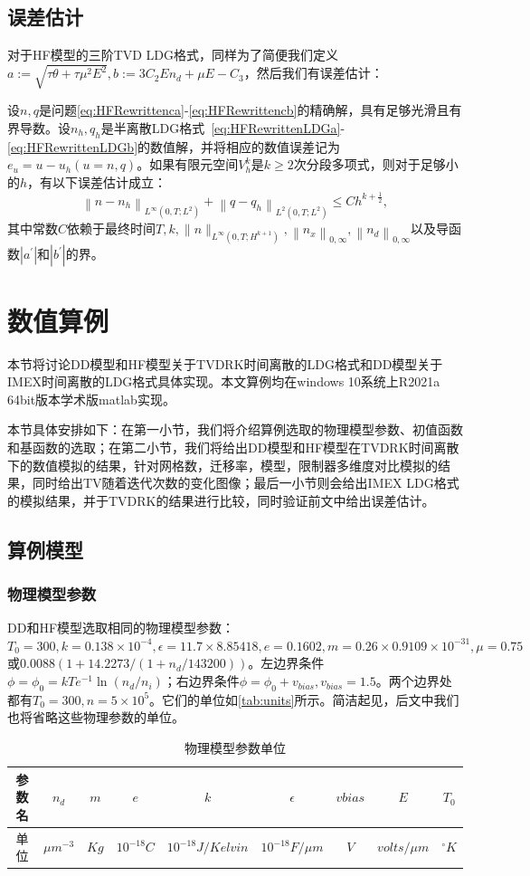 \subsection{误差估计}
对于HF模型的三阶TVD LDG格式，同样为了简便我们定义$a:=\sqrt{\tau \theta+\tau \mu^{2}E^{2}}, b:=3 C_{2} E n_{d}+\mu E-C_{3}$，然后我们有误差估计\cite{liu2010error}：
\begin{theorem}
	设$n, q$是问题\eqref{eq:HFRewrittenca}-\eqref{eq:HFRewrittencb}的精确解，具有足够光滑且有界导数。设$n_h, q_h$是半离散LDG格式~\eqref{eq:HFRewrittenLDGa}-\eqref{eq:HFRewrittenLDGb}的数值解，并将相应的数值误差记为$e_{u}=u-u_{h}(u=n, q)$。如果有限元空间$V_{h}^{k}$是$k \geq 2$次分段多项式，则对于足够小的$h$，有以下误差估计成立：
	$$
		\left\|n-n_h\right\|_{L^{\infty}\left(0, T ; L^{2}\right)}+\left\|q-q_h\right\|_{L^{2}\left(0, T ; L^{2}\right)} \leq C h^{k+\frac{1}{2}},
	$$
	其中常数$C$依赖于最终时间$T, k, \|n\|_{L^{\infty}\left(0, T ; H^{k+1}\right)}, \left\|n_{x}\right\|_{0, \infty}, \left\|n_{d}\right\|_{0, \infty}$以及导函数$\left|a^{\prime}\right|$和$\left|b^{\prime}\right|$的界。
\end{theorem}
\section{数值算例}
本节将讨论DD模型和HF模型关于TVDRK时间离散的LDG格式和DD模型关于IMEX时间离散的LDG格式具体实现。本文算例均在windows 10系统上R2021a 64bit版本学术版matlab实现。

本节具体安排如下：在第一小节，我们将介绍算例选取的物理模型参数、初值函数和基函数的选取；在第二小节，我们将给出DD模型和HF模型在TVDRK时间离散下的数值模拟的结果，针对网格数，迁移率，模型，限制器多维度对比模拟的结果，同时给出TV随着迭代次数的变化图像；最后一小节则会给出IMEX LDG格式的模拟结果，并于TVDRK的结果进行比较，同时验证前文中给出误差估计。
\subsection{算例模型}
\subsubsection{物理模型参数}
DD和HF模型选取相同的物理模型参数：$T_0 = 300, k = 0.138 \times 10^{-4}, \epsilon = 11.7\times 8.85418, e = 0.1602, m = 0.26\times0.9109\times 10^{-31}, \mu = 0.75 $或$0.0088(1+14.2273/(1+n_d/143200))$。左边界条件$\phi=\phi_0=kTe^{-1}\ln(n_d/n_i)$；右边界条件$\phi = \phi_0+v_{bias}, v_{bias}=1.5$。两个边界处都有$T_0 = 300, n = 5\times 10^5$。它们的单位如\autoref{tab:units}所示\cite{cercignani2000deviceb}。简洁起见，后文中我们也将省略这些物理参数的单位。
\begin{table}[htbp]
	\centering
	\begin{tabular}{ccccccccc}
		\hline
		参数名 & $n_d$        & $m$  & $e$         & $k$                & $\epsilon$        & $vbias$ & $E$           & $T_0$      \\
		\hline
		单位   & $\mu m^{-3}$ & $Kg$ & $10^{-18}C$ & $10^{-18}J/Kelvin$ & $10^{-18}F/\mu m$ & $V$     & $volts/\mu m$ & $^\circ K$ \\
		\hline
	\end{tabular}
	\caption{物理模型参数单位}
	\label{tab:units}
\end{table}

